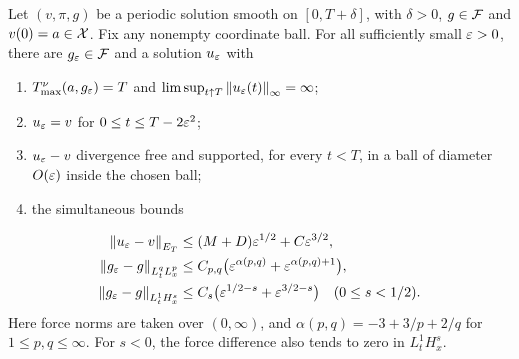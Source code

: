 \begin{theorem}\label{thm:insertion}
Let $(v,\pi,g)$ be a periodic solution smooth on $[0,T+\delta]$, with
$\delta>0$, $g\in\mathcal F$ and $v(0)=a\in\mathcal X$. Fix any nonempty coordinate ball.
For all sufficiently small $\varepsilon>0$, there are $g_\varepsilon\in\mathcal F$ and a solution $u_\varepsilon$ with
\begin{enumerate}[label=(\roman*),nosep]
\item $T_{\max}^{\nu}(a,g_\varepsilon)=T$ and
$\limsup_{t\uparrow T}\left\lVert u_\varepsilon(t)\right\rVert_\infty=\infty$;
\item $u_\varepsilon=v$ for $0\le t\le T-2\varepsilon^2$;
\item $u_\varepsilon-v$ divergence free and supported, for every $t<T$, in a ball of diameter $O(\varepsilon)$ inside the chosen ball;
\item the simultaneous bounds
\end{enumerate}
\begin{align}
 \left\lVert u_\varepsilon-v\right\rVert_{E_T}
   &\le (M+D)\varepsilon^{1/2}+C\varepsilon^{3/2},\label{eq:Eclose}\\
 \left\lVert g_\varepsilon-g\right\rVert_{L^q_tL^p_x}
   &\le C_{p,q}\bigl(\varepsilon^{\alpha(p,q)}
                    +\varepsilon^{\alpha(p,q)+1}\bigr),\label{eq:Fclose}\\
 \left\lVert g_\varepsilon-g\right\rVert_{L^1_tH^s_x}
   &\le C_s\bigl(\varepsilon^{1/2-s}+\varepsilon^{3/2-s}\bigr)
                         \quad(0\le s<1/2).\label{eq:Hsclose}
\end{align}
Here force norms are taken over $(0,\infty)$, and
$\alpha(p,q)=-3+3/p+2/q$ for $1\le p,q\le\infty$.
For $s<0$, the force difference also tends to zero in $L^1_tH^s_x$.
\end{theorem}
